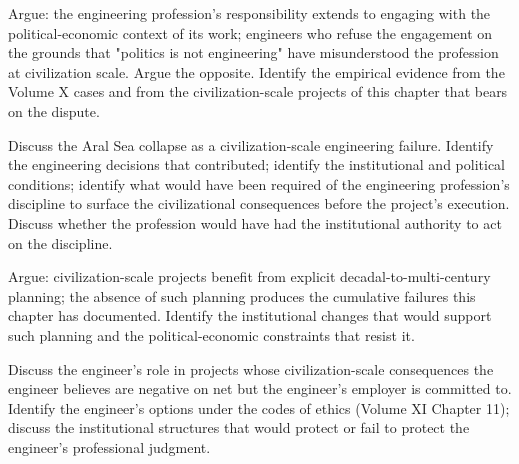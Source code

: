 \begin{exercise}
Argue: the engineering profession's responsibility extends to engaging with the political-economic context of its work; engineers who refuse the engagement on the grounds that "politics is not engineering" have misunderstood the profession at civilization scale. Argue the opposite. Identify the empirical evidence from the Volume X cases and from the civilization-scale projects of this chapter that bears on the dispute.
\end{exercise}

\begin{exercise}
Discuss the Aral Sea collapse as a civilization-scale engineering failure. Identify the engineering decisions that contributed; identify the institutional and political conditions; identify what would have been required of the engineering profession's discipline to surface the civilizational consequences before the project's execution. Discuss whether the profession would have had the institutional authority to act on the discipline.
\end{exercise}

\begin{exercise}
Argue: civilization-scale projects benefit from explicit decadal-to-multi-century planning; the absence of such planning produces the cumulative failures this chapter has documented. Identify the institutional changes that would support such planning and the political-economic constraints that resist it.
\end{exercise}

\begin{exercise}
Discuss the engineer's role in projects whose civilization-scale consequences the engineer believes are negative on net but the engineer's employer is committed to. Identify the engineer's options under the codes of ethics (Volume XI Chapter 11); discuss the institutional structures that would protect or fail to protect the engineer's professional judgment.
\end{exercise}

